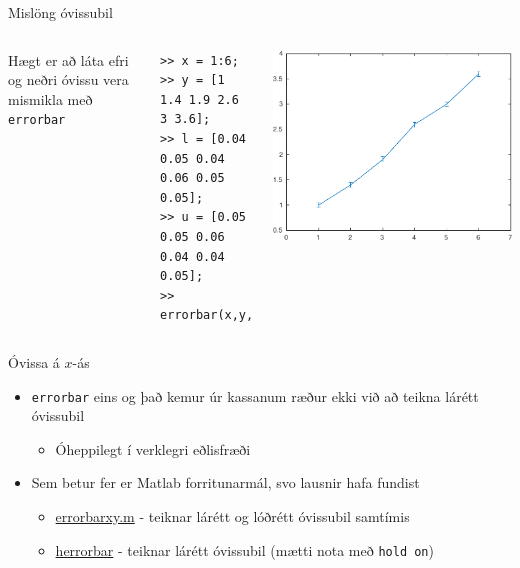 \documentclass{beamer}
\begin{document}
\begin{frame}[fragile]{Mislöng óvissubil}
\begin{columns}
Hægt er að láta efri og neðri óvissu vera mismikla með \texttt{errorbar}
\begin{verbatim}
>> x = 1:6;
>> y = [1 1.4 1.9 2.6 3 3.6];
>> l = [0.04 0.05 0.04 0.06 0.05 0.05];
>> u = [0.05 0.05 0.06 0.04 0.04 0.05];
>> errorbar(x,y,l,u)
\end{verbatim}
\includegraphics[width=\textwidth]{../Pics/uneven-errorbar}
\end{columns}
\end{frame}

\begin{frame}{Óvissa á $x$-ás}
\begin{itemize}
 \item \texttt{errorbar} eins og það kemur úr kassanum ræður ekki við að teikna lárétt óvissubil
 \begin{itemize}
  \item Óheppilegt í verklegri eðlisfræði
 \end{itemize}
 \item Sem betur fer er Matlab forritunarmál, svo lausnir hafa fundist
 \begin{itemize}
  \item \href{http://www.mathworks.com/matlabcentral/fileexchange/40221-plot-data-with-error-bars-on-both-x-and-y-axes}{errorbarxy.m} - teiknar lárétt og lóðrétt óvissubil samtímis
  \item \href{http://www.mathworks.com/matlabcentral/fileexchange/3963-herrorbar}{herrorbar} - teiknar lárétt óvissubil (mætti nota með \texttt{hold on})
 \end{itemize}
\end{itemize}
\end{frame}
\end{document}
